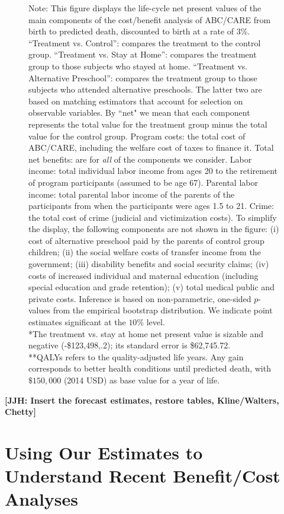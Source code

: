 \begin{figure}
Note: This figure displays the life-cycle net present values of the main components of the cost/benefit analysis of ABC/CARE from birth to predicted death, discounted to birth at a rate of 3\%. ``Treatment vs. Control'': compares the treatment to the control group. ``Treatment vs. Stay at Home'': compares the treatment group to those subjects who stayed at home. ``Treatment vs. Alternative Preschool'': compares the treatment group to those subjects who attended alternative preschools. The latter two are based on matching estimators that account for selection on observable variables. By ``net" we mean that each component represents the total value for the treatment group minus the total value for the control group. Program costs: the total cost of ABC/CARE, including the welfare cost of taxes to finance it. Total net benefits: are for \textit{all} of the components we consider. Labor income: total individual labor income from ages 20 to the retirement of program participants (assumed to be age 67). Parental labor income: total parental labor income of the parents of the participants from when the participants were ages 1.5 to 21. Crime: the total cost of crime (judicial and victimization costs). To simplify the display, the following components are not shown in the figure: (i) cost of alternative preschool paid by the parents of control group children; (ii) the social welfare costs of transfer income from the government; (iii) disability benefits and social security claims; (iv) costs of increased individual and maternal education (including special education and grade retention); (v) total medical public and private costs. Inference is based on non-parametric, one-sided $p$-values from the empirical bootstrap distribution. We indicate point estimates significant at the $10\%$ level.\\
*The treatment vs. stay at home net present value is sizable and negative (-\$123,498,.2); its standard error is \$62,745.72.\\
**QALYs refers to the quality-adjusted life years. Any gain corresponds to better health conditions until predicted death, with $\$150,000$ (2014 USD) as base value for a year of life.\\
\end{figure}

\textbf{[JJH: Insert the forecast estimates, restore tables, Kline/Walters, Chetty]}

\section{Using Our Estimates to Understand Recent Benefit/Cost Analyses}\label{appendix:bcaestimates}

